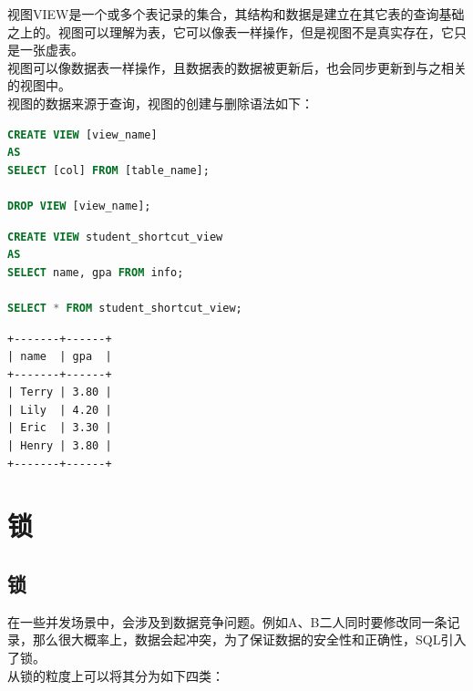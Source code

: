 \documentclass[12pt, openany, oneside]{book}
\begin{document}
视图VIEW是一个或多个表记录的集合，其结构和数据是建立在其它表的查询基础之上的。视图可以理解为表，它可以像表一样操作，但是视图不是真实存在，它只是一张虚表。\\

视图可以像数据表一样操作，且数据表的数据被更新后，也会同步更新到与之相关的视图中。\\

视图的数据来源于查询，视图的创建与删除语法如下：

\vspace{-0.5cm}

\begin{lstlisting}[language=SQL]
CREATE VIEW [view_name] 
AS
SELECT [col] FROM [table_name];

DROP VIEW [view_name];
\end{lstlisting}

\vspace{0.5cm}


\begin{lstlisting}[language=SQL]
CREATE VIEW student_shortcut_view 
AS
SELECT name, gpa FROM info;

SELECT * FROM student_shortcut_view;
\end{lstlisting}

\begin{tcolorbox}
	\begin{verbatim}
+-------+------+
| name  | gpa  |
+-------+------+
| Terry | 3.80 |
| Lily  | 4.20 |
| Eric  | 3.30 |
| Henry | 3.80 |
+-------+------+
	\end{verbatim}
\end{tcolorbox}

\newpage

\chapter{锁}

\section{锁}

在一些并发场景中，会涉及到数据竞争问题。例如A、B二人同时要修改同一条记录，那么很大概率上，数据会起冲突，为了保证数据的安全性和正确性，SQL引入了锁。\\

从锁的粒度上可以将其分为如下四类：
\end{document}

